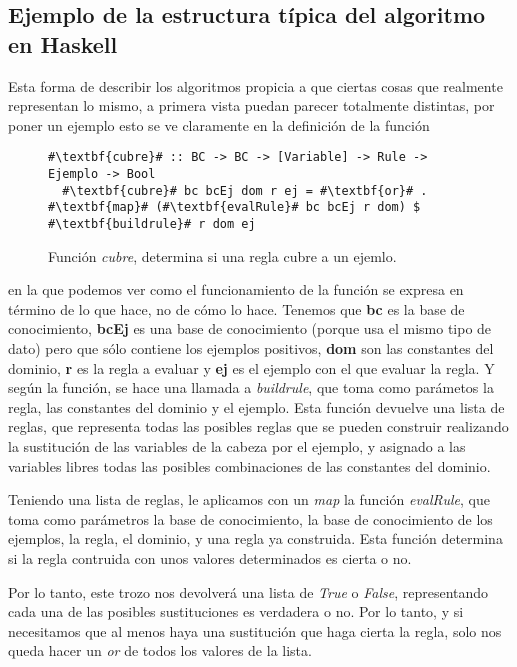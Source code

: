 \subsection{Ejemplo de la estructura típica del algoritmo en Haskell}
Esta forma de describir los algoritmos propicia a que ciertas cosas que realmente representan lo mismo, a primera vista puedan parecer totalmente distintas, por poner un ejemplo esto se ve claramente en la definición de la función

\begin{figure}
  \begin{lstlisting}[escapechar=\#]
  #\textbf{cubre}# :: BC -> BC -> [Variable] -> Rule -> Ejemplo -> Bool
  #\textbf{cubre}# bc bcEj dom r ej = #\textbf{or}# . #\textbf{map}# (#\textbf{evalRule}# bc bcEj r dom) $ #\textbf{buildrule}# r dom ej
\end{lstlisting}
\caption{Función \emph{cubre}, determina si una regla cubre a un ejemlo.}
\label{fig:figura2}
\end{figure}

en la que podemos ver como el funcionamiento de la función se expresa en término de lo que hace, no de cómo lo hace. Tenemos que \textbf{bc} es la base de conocimiento, \textbf{bcEj} es una base de conocimiento (porque usa el mismo tipo de dato) pero que sólo contiene los ejemplos positivos, \textbf{dom} son las constantes del dominio, \textbf{r} es la regla a evaluar y \textbf{ej} es el ejemplo con el que evaluar la regla. Y según la función, se hace una llamada a \emph{buildrule}, que toma como parámetos la regla, las constantes del dominio y el ejemplo. Esta función devuelve una lista de reglas, que representa todas las posibles reglas que se pueden construir realizando la sustitución de las variables de la cabeza por el ejemplo, y asignado a las variables libres todas las posibles combinaciones de las constantes del dominio.

Teniendo una lista de reglas, le aplicamos con un \emph{map} la función \emph{evalRule}, que toma como parámetros la base de conocimiento, la base de conocimiento de los ejemplos, la regla, el dominio, y una regla ya construida. Esta función determina si la regla contruida con unos valores determinados es cierta o no.

Por lo tanto, este trozo nos devolverá una lista de \emph{True} o \emph{False}, representando cada una de las posibles sustituciones es verdadera o no. Por lo tanto, y si necesitamos que al menos haya una sustitución que haga cierta la regla, solo nos queda hacer un \emph{or} de todos los valores de la lista.

